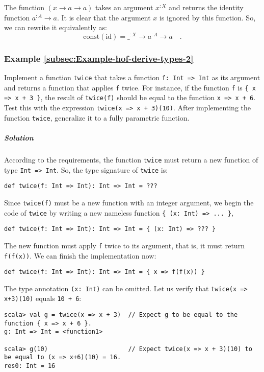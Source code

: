 The function $\left(x\rightarrow a\rightarrow a\right)$ takes an
argument $x^{:X}$ and returns the identity function $a^{:A}\rightarrow a$.
It is clear that the argument $x$ is ignored by this function. So,
we can rewrite it equivalently as:
\[
\text{const}\left(\text{id}\right)=\_^{:X}\rightarrow a^{:A}\rightarrow a\quad.
\]


\subsubsection{Example \label{subsec:Example-hof-derive-types-2}\ref{subsec:Example-hof-derive-types-2}}

Implement a function \lstinline!twice! that takes a function \lstinline!f: Int => Int!
as its argument and returns a function that applies \lstinline!f!
twice. For instance, if the function \lstinline!f! is \lstinline!{ x => x + 3 }!,
the result of \lstinline!twice(f)! should be equal to the function
\lstinline!x => x + 6!. Test this with the expression \lstinline!twice(x => x + 3)(10)!.
After implementing the function \lstinline!twice!, generalize it
to a fully parametric function.

\subparagraph{Solution}

According to the requirements, the function \lstinline!twice! must
return a new function of type \lstinline!Int => Int!. So, the type
signature of \lstinline!twice! is:
\begin{lstlisting}
def twice(f: Int => Int): Int => Int = ???
\end{lstlisting}
Since \lstinline!twice(f)! must be a new function with an integer
argument, we begin the code of \lstinline!twice! by writing a new
nameless function \lstinline!{ (x: Int) => ... }!,
\begin{lstlisting}
def twice(f: Int => Int): Int => Int = { (x: Int) => ??? }
\end{lstlisting}
The new function must apply \lstinline!f! twice to its argument,
that is, it must return \lstinline!f(f(x))!. We can finish the implementation
now:
\begin{lstlisting}
def twice(f: Int => Int): Int => Int = { x => f(f(x)) }
\end{lstlisting}
The type annotation \lstinline!(x: Int)! can be omitted. Let us verify
that \lstinline!twice(x => x+3)(10)! equals \lstinline!10 + 6!:
\begin{lstlisting}
scala> val g = twice(x => x + 3)  // Expect g to be equal to the function { x => x + 6 }.
g: Int => Int = <function1>

scala> g(10)                      // Expect twice(x => x + 3)(10) to be equal to (x => x+6)(10) = 16.
res0: Int = 16
\end{lstlisting}

